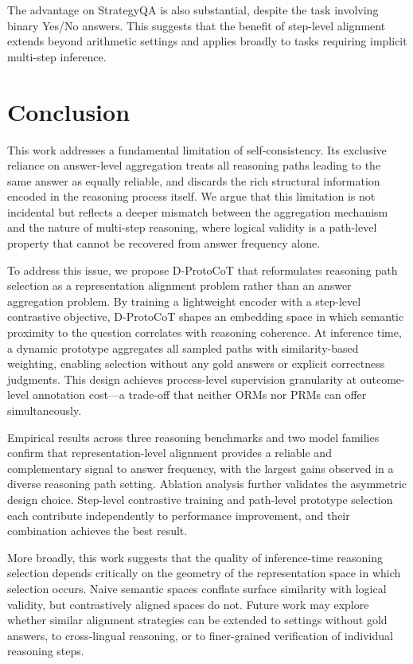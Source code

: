\documentclass[a4paper,fleqn]{cas-dc}
\begin{document}
The advantage on StrategyQA is also substantial, despite the task involving binary Yes/No answers.
This suggests that the benefit of step-level alignment extends beyond arithmetic settings and applies broadly to tasks requiring implicit multi-step inference.

\section{Conclusion}

This work addresses a fundamental limitation of self-consistency. Its exclusive reliance on answer-level aggregation treats all reasoning paths leading to the same answer as equally reliable, and discards the rich structural information encoded in the reasoning process itself.
We argue that this limitation is not incidental but reflects a deeper mismatch between the aggregation mechanism and the nature of multi-step reasoning, where logical validity is a path-level property that cannot be recovered from answer frequency alone.

To address this issue, we propose D-ProtoCoT that reformulates reasoning path selection as a representation alignment problem rather than an answer aggregation problem.
By training a lightweight encoder with a step-level contrastive objective, D-ProtoCoT shapes an embedding space in which semantic proximity to the question correlates with reasoning coherence.
At inference time, a dynamic prototype aggregates all sampled paths with similarity-based weighting, enabling selection without any gold answers or explicit correctness judgments.
This design achieves process-level supervision granularity at outcome-level annotation cost---a trade-off that neither ORMs nor PRMs can offer simultaneously.

Empirical results across three reasoning benchmarks and two model families confirm that representation-level alignment provides a reliable and complementary signal to answer frequency, with the largest gains observed in a diverse reasoning path setting.
Ablation analysis further validates the asymmetric design choice. Step-level contrastive training and path-level prototype selection each contribute independently to performance improvement, and their combination achieves the best result.

More broadly, this work suggests that the quality of inference-time reasoning selection depends critically on the geometry of the representation space in which selection occurs.
Naive semantic spaces conflate surface similarity with logical validity, but contrastively aligned spaces do not.
Future work may explore whether similar alignment strategies can be extended to settings without gold answers, to cross-lingual reasoning, or to finer-grained verification of individual reasoning steps.
\end{document}
